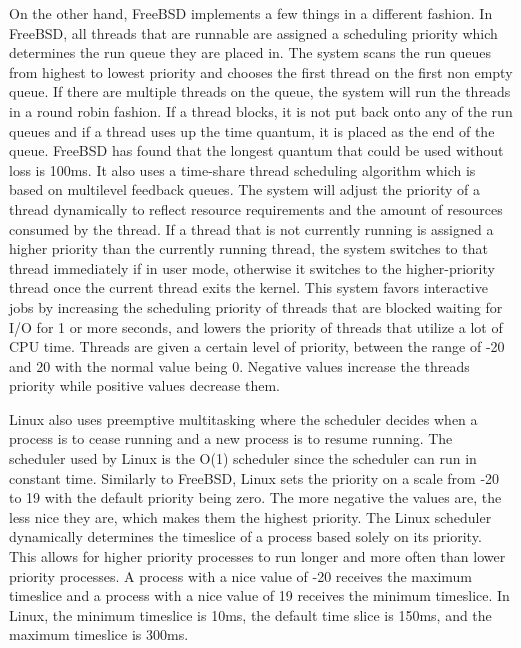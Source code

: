\documentclass[letterpaper,10pt,draftclsnofoot,onecolumn,titlepage]{IEEEtran}
\begin{document}
		On the other hand, FreeBSD implements a few things in a different fashion. In FreeBSD, all threads that are runnable are assigned a scheduling priority which determines the run queue they are placed in. The system scans the run queues from highest to lowest priority and chooses the first thread on the first non empty queue. If there are multiple threads on the queue, the system will run the threads in a round robin fashion. If a thread blocks, it is not put back onto any of the run queues and if a thread uses up the time quantum, it is placed as the end of the queue. \cite{FreeBSD} FreeBSD has found that the longest quantum that could be used without loss is 100ms. It also uses a time-share thread scheduling algorithm which is based on multilevel feedback queues. The system will adjust the priority of a thread dynamically to reflect resource requirements and the amount of resources consumed by the thread. If a thread that is not currently running is assigned a higher priority than the currently running thread, the system switches to that thread immediately if in user mode, otherwise it switches to the higher-priority thread once the current thread exits the kernel. This system favors interactive jobs by increasing the scheduling priority of threads that are blocked waiting for I/O for 1 or more seconds, and lowers the priority of threads that utilize a lot of CPU time. Threads are given a certain level of priority, between the range of {-20} and 20 with the normal value being 0. Negative values increase the threads priority while positive values decrease them.
		\par
		Linux also uses preemptive multitasking where the scheduler decides when a process is to cease running and a new process is to resume running. The scheduler used by Linux is the O(1) scheduler since the scheduler can run in constant time. Similarly to FreeBSD, Linux sets the priority on a scale from -20 to 19 with the default priority being zero. The more negative the values are, the less nice they are, which makes them the highest priority. The Linux scheduler dynamically determines the timeslice of a process based solely on its priority. This allows for higher priority processes to run longer and more often than lower priority processes. \cite{LinuxKernelDev} A process with a nice value of {-20} receives the maximum timeslice and a process with a nice value of 19 receives the minimum timeslice. In Linux, the minimum timeslice is 10ms, the default time slice is 150ms, and the maximum timeslice is 300ms.
		\par
\end{document}
